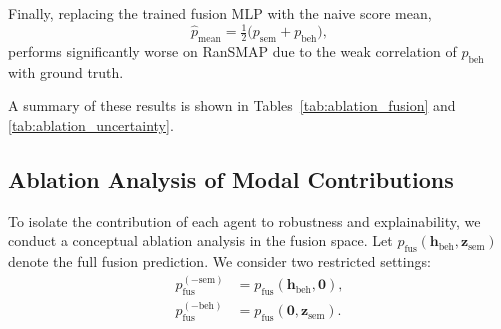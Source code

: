 \documentclass[3p]{elsarticle}
\begin{document}
Finally, replacing the trained fusion MLP with the naive score mean,
\begin{equation}
\hat{p}_{\mathrm{mean}} = \tfrac{1}{2} \bigl( p_{\mathrm{sem}} + p_{\mathrm{beh}} \bigr),
\label{eq:mean_fusion}
\end{equation}
performs significantly worse on RanSMAP due to the weak correlation of \(p_{\mathrm{beh}}\) with ground truth.

A summary of these results is shown in Tables~\ref{tab:ablation_fusion} and \ref{tab:ablation_uncertainty}.

\begin{table}[ht]
\centering
{}
\caption{Ablation of fusion strategies.}
\label{tab:ablation_fusion}
\end{table}

\begin{table}[ht]
\centering
{}
\caption{Effect of removing uncertainty terms on triage performance.}
\label{tab:ablation_uncertainty}
\end{table}

\subsection{Ablation Analysis of Modal Contributions}

To isolate the contribution of each agent to robustness and explainability, we conduct a conceptual ablation analysis in the fusion space.
Let $p_{\mathrm{fus}}(\mathbf{h}_{\mathrm{beh}}, \mathbf{z}_{\mathrm{sem}})$ denote the full fusion prediction.
We consider two restricted settings:
\begin{align}
p_{\mathrm{fus}}^{(-\mathrm{sem})} &= p_{\mathrm{fus}}(\mathbf{h}_{\mathrm{beh}}, \mathbf{0}),
\label{eq:ablate_sem} \\
p_{\mathrm{fus}}^{(-\mathrm{beh})} &= p_{\mathrm{fus}}(\mathbf{0}, \mathbf{z}_{\mathrm{sem}}).
\label{eq:ablate_beh}
\end{align}
\end{document}

